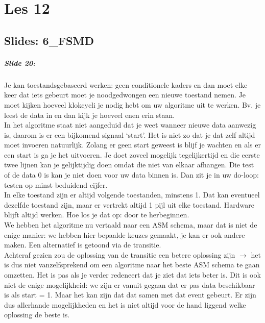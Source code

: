 \documentclass[10pt,a4paper]{book}
\begin{document}
\chapter{Les 12}

\section{Slides: 6\_FSMD}

\paragraph{Slide 20:} Je kan toestandsgebaseerd werken: geen conditionele kaders en dan moet elke keer dat iets gebeurt moet je noodgedwongen een nieuwe toestand nemen. Je moet kijken hoeveel klokcycli je nodig hebt om uw algoritme uit te werken. Bv. je leest de data in en dan kijk je hoeveel enen erin staan.\\
In het algoritme staat niet aangeduid dat je weet wanneer nieuwe data aanwezig is, daarom is er een bijkomend signaal `start'. Het is niet zo dat je dat zelf altijd moet invoeren natuurlijk. Zolang er geen start geweest is blijf je wachten en als er een start is ga je het uitvoeren. Je doet zoveel mogelijk tegelijkertijd en die eerste twee lijnen kan je gelijktijdig doen omdat die niet van elkaar afhangen. Die test of de data 0 is kan je niet doen voor uw data binnen is. Dan zit je in uw do-loop: testen op minst beduidend cijfer.\\
In elke toestand zijn er altijd volgende toestanden, minstens 1. Dat kan eventueel dezelfde toestand zijn, maar er vertrekt altijd 1 pijl uit elke toestand. Hardware blijft altijd werken. Hoe los je dat op: door te herbeginnen.\\
We hebben het algoritme nu vertaald naar een ASM schema, maar dat is niet de enige manier: we hebben hier bepaalde keuzes gemaakt, je kan er ook andere maken. Een alternatief is getoond via de transitie.\\
Achteraf gezien zou de oplossing van de transitie een betere oplossing zijn $\rightarrow$ het is dus niet vanzelfsprekend om een algoritme naar het beste ASM schema te gaan omzetten. Het is pas als je verder redeneert dat je ziet dat iets beter is. Dit is ook niet de enige mogelijkheid: we zijn er vanuit gegaan dat er pas data beschikbaar is als start = 1. Maar het kan zijn dat dat samen met dat event gebeurt. Er zijn dus allerhande mogelijkheden en het is niet altijd voor de hand liggend welke oplossing de beste is.
\end{document}
